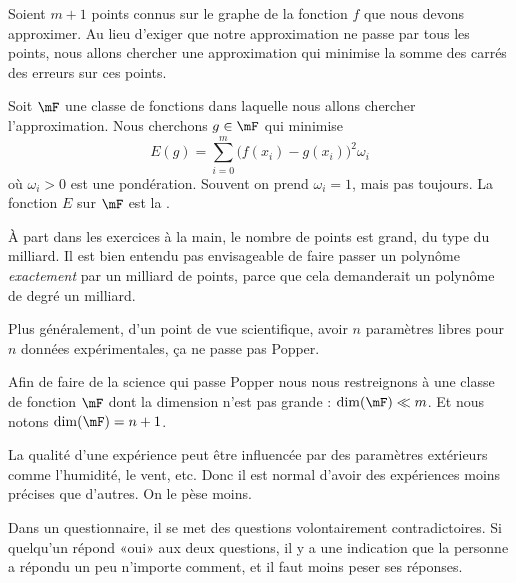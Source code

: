 Soient \( m+1\) points connus sur le graphe de la fonction \( f\) que nous devons approximer. Au lieu d'exiger que notre approximation ne passe par tous les points, nous allons chercher une approximation qui minimise la somme des carrés des erreurs sur ces points.

Soit \( \mF\) une classe de fonctions dans laquelle nous allons chercher l'approximation. Nous cherchons \( g\in \mF\) qui minimise
\begin{equation}    \label{EQooJGQVooKwZZVJ}
   E(g)= \sum_{i=0}^m \big( f(x_i)-g(x_i) \big)^2\omega_i
\end{equation}
où \( \omega_i>0\) est une pondération. Souvent on prend \( \omega_i=1\), mais pas toujours. La fonction \( E\) sur \( \mF\) est la .

\begin{normaltext}
    À part dans les exercices à la main, le nombre de points est grand, du type du milliard. Il est bien entendu pas envisageable de faire passer un polynôme \emph{exactement} par un milliard de points, parce que cela demanderait un polynôme de degré un milliard.

    Plus généralement, d'un point de vue scientifique, avoir \( n\) paramètres libres pour \( n\) données expérimentales, ça ne passe pas Popper.

    Afin de faire de la science qui passe Popper nous nous restreignons à une classe de fonction \( \mF\) dont la dimension n'est pas grande : \( \dim( \mF)\ll m\). Et nous notons \( \dim(\mF)=n+1\).
\end{normaltext}

\begin{example}
    La qualité d'une expérience peut être influencée par des paramètres extérieurs comme l'humidité, le vent, etc. Donc il est normal d'avoir des expériences moins précises que d'autres. On le pèse moins.
\end{example}

\begin{example}
    Dans un questionnaire, il se met des questions volontairement contradictoires. Si quelqu'un répond «oui» aux deux questions, il y a une indication que la personne a répondu un peu n'importe comment, et il faut moins peser ses réponses.
\end{example}

